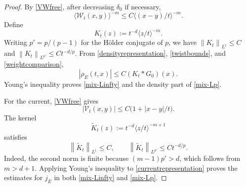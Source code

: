 \documentclass[11pt]{article}
\newcommand{\la}{\langle}
\newcommand{\ra}{\rangle}
\newcommand{\norm}[1]{\left\lVert #1\right\rVert}
\newcommand{\abs}[1]{\left\lvert #1\right\rvert}
\begin{document}
\begin{proof}
By \eqref{VWfree}, after decreasing $\delta_0$ if necessary,
\begin{equation}\label{weightcomparison}
 \la \mathcal W_t(x,y)\ra^{-m}
 \leq C\la (x-y)/t\ra^{-m}.
\end{equation}
Define
\begin{equation*}
 K_t(z):=t^{-d}\la z/t\ra^{-m}.
\end{equation*}
Writing $p'=p/(p-1)$ for the H\"older conjugate of $p$, we have
 $\norm{K_t}_{L^1}\leq C$ and
$\norm{K_t}_{L^{p'}}\leq Ct^{-d/p}$.  From
\eqref{densityrepresentation}, \eqref{twistbounds}, and
\eqref{weightcomparison},
\begin{equation}\label{rho-convolution}
 \abs{\rho_E(t,x)}\leq C(K_t*G_0)(x).
\end{equation}
Young's inequality proves \eqref{mix-Linfty} and the density part of
\eqref{mix-Lp}.

For the current, \eqref{VWfree} gives
\begin{equation*}
 \abs{\mathcal V_t(x,y)}\leq C\big(1+\abs{x-y}/t\big).
\end{equation*}
The kernel
\begin{equation*}
 \widetilde K_t(z):=t^{-d}\la z/t\ra^{-m+1}
\end{equation*}
satisfies
\begin{equation*}
 \norm{\widetilde K_t}_{L^1}\leq C,\qquad
 \norm{\widetilde K_t}_{L^{p'}}\leq Ct^{-d/p}.
\end{equation*}
Indeed, the second norm is finite because $(m-1)p'>d$, which follows from
$m>d+1$.  Applying Young's inequality to \eqref{currentrepresentation}
proves the estimates for $j_E$ in both \eqref{mix-Linfty} and
\eqref{mix-Lp}.


\end{proof}
\end{document}
